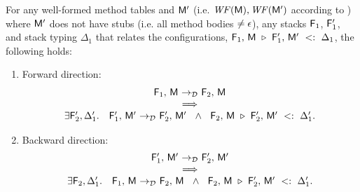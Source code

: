 {\begin{lemma}\label{lem:bisim-disp}
  For any well-formed method tables \mtbl and $\mathsf{M}'$
  (i.e. $\mathit{WF}(\mathsf{M}), \mathit{WF}(\mathsf{M}')$ according to
  ) where $\mathsf{M}'$ does not have stubs
  (i.e. all method bodies $\neq \epsilon$),
  any stacks $\mathsf{F}_1$, $\mathsf{F}'_1$, and stack typing $\Delta_1$
  that relates the configurations,
$\mathsf{F}_1,\, \mathsf{M}\ \triangleright\ \mathsf{F}'_1,\, \mathsf{M}'\ <:\ \Delta_1$,
  the following holds:
  \begin{enumerate}
    \item Forward direction:
      \[
      \begin{array}{c}
        \config{\frm_1}{\mtbl} \stepd \config{\frm_2}{\mtbl} \\
        \implies \\
        \exists \frm'_2, \Delta'_1.\quad
          \config{\frm'_1}{\mtbl'} \stepd \config{\frm'_2}{\mtbl'}\ \ \land\ \
          \optconfig{\frm_2}{\mtbl}{\frm'_2}{\mtbl'}{\Delta'_1}.
      \end{array}
      \]
    \item Backward direction:
      \[
      \begin{array}{c}
        \config{\frm'_1}{\mtbl'} \stepd \config{\frm'_2}{\mtbl'} \\
        \implies\\
        \exists \frm_2, \Delta'_1.\quad
          \config{\frm_1}{\mtbl} \stepd \config{\frm_2}{\mtbl}\ \ \land\ \
          \optconfig{\frm_2}{\mtbl}{\frm'_2}{\mtbl'}{\Delta'_1}.
      \end{array}
      \]
  \end{enumerate}
\end{lemma}

}
